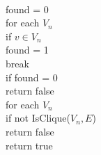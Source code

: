 \documentclass[11pt]{article}
\begin{document}
\begin{solution}
\begin{itemize}
\begin{algo}
                \\ found = 0
                \\ for each $V_n$ \+
                \\ if $v \in V_n$ \+
                \\ found = 1
                \\ break \- \-
                \\ if found = 0 \+
                \\ return false \- \-
                \\ for each $V_n$ \+
                \\ if not IsClique($V_n, E$) \+
                \\ return false \- \- 
                \\ return true \-


\end{algo}
\end{itemize}
\end{solution}
\end{document}
